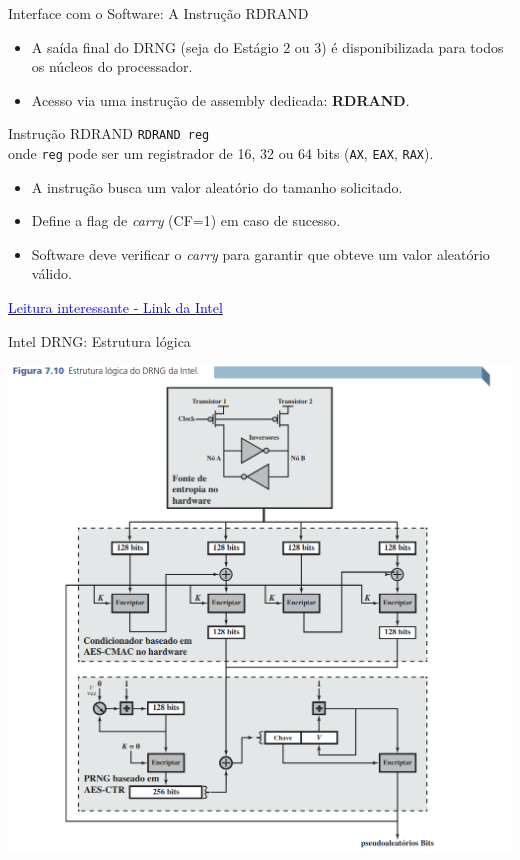 \begin{frame}{Interface com o Software: A Instrução RDRAND}
    \begin{itemize}
        \item A saída final do DRNG (seja do Estágio 2 ou 3) é disponibilizada para todos os núcleos do processador.
        \item Acesso via uma instrução de assembly dedicada: \textbf{RDRAND}.
    \end{itemize}

    \begin{block}{Instrução RDRAND}
        \texttt{RDRAND reg} \\
        onde \texttt{reg} pode ser um registrador de 16, 32 ou 64 bits (\texttt{AX}, \texttt{EAX}, \texttt{RAX}).
        \begin{itemize}
            \item A instrução busca um valor aleatório do tamanho solicitado.
            \item Define a flag de \emph{carry} (CF=1) em caso de sucesso.
            \item Software deve verificar o \emph{carry} para garantir que obteve um valor aleatório válido.
        \end{itemize}
    \end{block}


   \href{https://www.intel.com/content/www/us/en/developer/articles/guide/intel-digital-random-number-generator-drng-software-implementation-guide.html}{\textcolor{blue}{Leitura interessante - Link da Intel}}
\end{frame}

\begin{frame}{Intel DRNG: Estrutura lógica}

\centering
\includegraphics[width=0.55\linewidth]{Figuras/estrutura-logica-drng-intel.png}




\end{frame}

